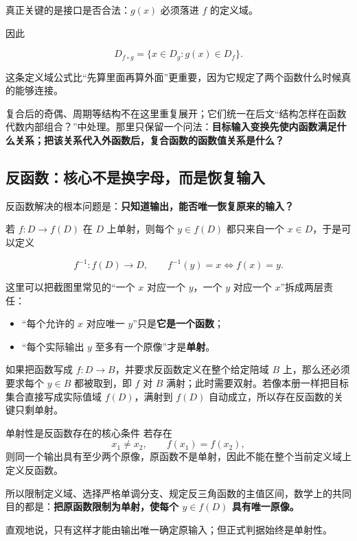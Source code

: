 \documentclass[11pt,a4paper]{ctexart}
\providecommand{\tightlist}{}
\begin{document}
真正关键的是接口是否合法：\(g(x)\) 必须落进 \(f\) 的定义域。

因此

\[
\boxed{
D_{f\circ g}=\{x\in D_g:g(x)\in D_f\}.
}
\]

这条定义域公式比``先算里面再算外面''更重要，因为它规定了两个函数什么时候真的能够连接。

复合后的奇偶、周期等结构不在这里重复展开；它们统一在后文“结构怎样在函数代数内部组合？”中处理。那里只保留一个问法：\textbf{目标输入变换先使内函数满足什么关系；把该关系代入外函数后，复合函数的函数值关系是什么？}

\subsection{反函数：核心不是换字母，而是恢复输入}\label{ux53cdux51fdux6570}

反函数解决的根本问题是：\textbf{只知道输出，能否唯一恢复原来的输入？}

若 \(f:D\to f(D)\) 在 \(D\) 上单射，则每个 \(y\in f(D)\) 都只来自一个
\(x\in D\)，于是可以定义

\[
f^{-1}:f(D)\to D,
\qquad
f^{-1}(y)=x\Longleftrightarrow f(x)=y.
\]

这里可以把截图里常见的“一个 \(x\) 对应一个 \(y\)，一个 \(y\) 对应一个 \(x\)”拆成两层责任：

\begin{itemize}
\tightlist
\item
  “每个允许的 \(x\) 对应唯一 \(y\)”只是\textbf{它是一个函数}；
\item
  “每个实际输出 \(y\) 至多有一个原像”才是\textbf{单射}。
\end{itemize}

如果把函数写成 \(f:D\to B\)，并要求反函数定义在整个给定陪域 \(B\) 上，那么还必须要求每个 \(y\in B\) 都被取到，即 \(f\) 对 \(B\) 满射；此时需要双射。若像本册一样把目标集合直接写成实际值域 \(f(D)\)，满射到 \(f(D)\) 自动成立，所以存在反函数的关键只剩单射。

\begin{corebox}{单射性是反函数存在的核心条件}
若存在
\[
x_1\ne x_2,
\qquad
f(x_1)=f(x_2),
\]
则同一个输出具有至少两个原像，原函数不是单射，因此不能在整个当前定义域上定义反函数。

所以限制定义域、选择严格单调分支、规定反三角函数的主值区间，数学上的共同目的都是：\textbf{把原函数限制为单射，使每个 \(y\in f(D)\) 具有唯一原像。}

直观地说，只有这样才能由输出唯一确定原输入；但正式判据始终是单射性。
\end{corebox}
\end{document}
